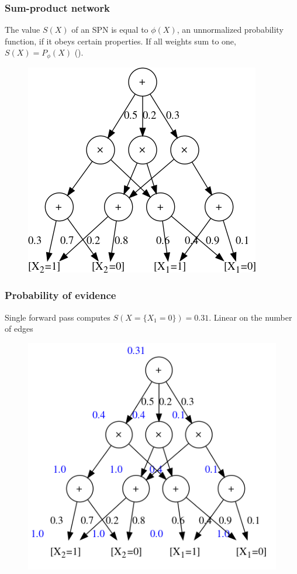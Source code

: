 \documentclass{beamer}
\begin{document}
\begin{frame}
  \frametitle{Sum-product network}

  The value $S(X)$ of an SPN is equal to $\phi(X)$, an unnormalized probability function, if it
  obeys certain properties. If all weights sum to one, $S(X)=P_{\phi}(X)$ (\cite{poon-domingos}).

  \begin{figure}
    \centering\includegraphics[height=0.6\textheight]{imgs/sample_spn.png}
  \end{figure}
\end{frame}

\begin{frame}
  \frametitle{Probability of evidence}

  Single forward pass computes $S(X=\{X_1=0\})=0.31$. Linear on the number of edges

  \begin{figure}
    \centering\includegraphics[height=0.6\textheight]{imgs/sample_spn_prob.png}
  \end{figure}
\end{frame}
\end{document}
